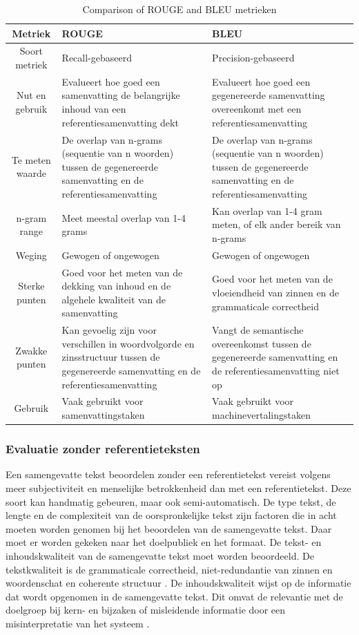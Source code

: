 \begin{table}[!h]
	\centering
	\begin{tabular}{|c|p{5cm}|p{5cm}|}
		\hline
		Metriek & ROUGE & BLEU \\
		\hline
		Soort metriek & Recall-gebaseerd & Precision-gebaseerd \\
		\hline
		Nut en gebruik & Evalueert hoe goed een samenvatting de belangrijke inhoud van een referentiesamenvatting dekt & Evalueert hoe goed een gegenereerde samenvatting overeenkomt met een referentiesamenvatting \\
		\hline
		Te meten waarde & De overlap van n-grams (sequentie van n woorden) tussen de gegenereerde samenvatting en de referentiesamenvatting & De overlap van n-grams (sequentie van n woorden) tussen de gegenereerde samenvatting en de referentiesamenvatting \\
		\hline
		n-gram range & Meet meestal overlap van 1-4 grams & Kan overlap van 1-4 gram meten, of elk ander bereik van n-grams \\
		\hline
		Weging & Gewogen of ongewogen & Gewogen of ongewogen \\
		\hline
		Sterke punten & Goed voor het meten van de dekking van inhoud en de algehele kwaliteit van de samenvatting & Goed voor het meten van de vloeiendheid van zinnen en de grammaticale correctheid \\
		\hline
		Zwakke punten & Kan gevoelig zijn voor verschillen in woordvolgorde en zinsstructuur tussen de gegenereerde samenvatting en de referentiesamenvatting & Vangt de semantische overeenkomst tussen de gegenereerde samenvatting en de referentiesamenvatting niet op \\
		\hline
		Gebruik & Vaak gebruikt voor samenvattingstaken & Vaak gebruikt voor machinevertalingstaken \\
		\hline
	\end{tabular}
	\caption{Comparison of ROUGE and BLEU metrieken}
	\label{tab:rouge_bleu_comparison}
\end{table}


\subsubsection{Evaluatie zonder referentieteksten}

Een samengevatte tekst beoordelen zonder een referentietekst vereist volgens \textcite{Steinberger2009} meer subjectiviteit en menselijke betrokkenheid dan met een referentietekst. Deze soort kan handmatig gebeuren, maar ook semi-automatisch. De type tekst, de lengte en de complexiteit van de oorspronkelijke tekst zijn factoren die in acht moeten worden genomen bij het beoordelen van de samengevatte tekst. Daar moet er worden gekeken naar het doelpubliek en het formaat. De tekst- en inhoudskwaliteit van de samengevatte tekst moet worden beoordeeld. De tekstkwaliteit is de grammaticale correctheid, niet-redundantie van zinnen en woordenschat en coherente structuur \autocite{McCombes2022}. De inhoudskwaliteit wijst op de informatie dat wordt opgenomen in de samengevatte tekst. Dit omvat de relevantie met de doelgroep bij kern- en bijzaken of misleidende informatie door een misinterpretatie van het systeem \autocite{McCombes2022}.


